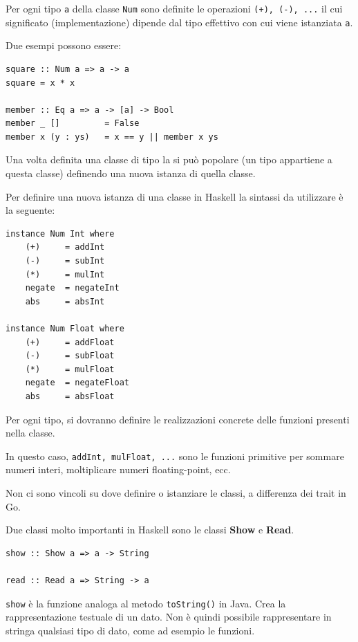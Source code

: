 \documentclass{article}
\begin{document}
Per ogni tipo \texttt{a} della classe \texttt{Num} sono definite le operazioni \texttt{(+), (-), ...} il cui significato (implementazione) dipende dal tipo effettivo con cui viene istanziata \texttt{a}.

Due esempi possono essere:
\begin{tcolorbox}
\begin{verbatim}
square :: Num a => a -> a
square = x * x

member :: Eq a => a -> [a] -> Bool
member _ []         = False
member x (y : ys)   = x == y || member x ys
\end{verbatim}
\end{tcolorbox}
\vspace{8pt}
Una volta definita una classe di tipo la si può popolare (un tipo appartiene a questa classe) definendo una nuova istanza di quella classe.

Per definire una nuova istanza di una classe in Haskell la sintassi da utilizzare è la seguente:
\begin{tcolorbox}
\begin{verbatim}
instance Num Int where
    (+)     = addInt
    (-)     = subInt
    (*)     = mulInt
    negate  = negateInt
    abs     = absInt

instance Num Float where
    (+)     = addFloat
    (-)     = subFloat
    (*)     = mulFloat
    negate  = negateFloat
    abs     = absFloat
\end{verbatim}
\end{tcolorbox}

Per ogni tipo, si dovranno definire le realizzazioni concrete delle funzioni presenti nella classe.

In questo caso, \texttt{addInt, mulFloat, ...} sono le funzioni primitive per sommare numeri interi, moltiplicare numeri floating-point, ecc.

Non ci sono vincoli su dove definire o istanziare le classi, a differenza dei trait in Go.

\pagebreak

Due classi molto importanti in Haskell sono le classi \textbf{Show} e \textbf{Read}.
\begin{tcolorbox}
\begin{verbatim}
show :: Show a => a -> String

read :: Read a => String -> a
\end{verbatim}
\end{tcolorbox}
\texttt{show} è la funzione analoga al metodo \texttt{toString()} in Java. Crea la rappresentazione testuale di un dato. Non è quindi possibile rappresentare in stringa qualsiasi tipo di dato, come ad esempio le funzioni.
\end{document}

